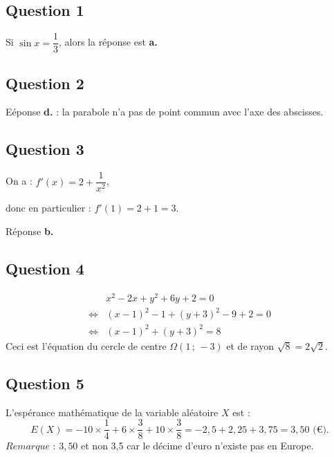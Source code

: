 \subsection*{Question 1}

Si \( \sin x = \dfrac{1}{3} \), alors la réponse est \textbf{a.}

\subsection*{Question 2}

Eéponse \textbf{d.} : la parabole n'a pas de point commun avec l'axe des abscisses.

\subsection*{Question 3}

On a : \(f'(x) = 2 + \dfrac{1}{x^2}\),

donc en particulier : \(f'(1) = 2 + 1 = 3\).

Réponse \textbf{b.}

\subsection*{Question 4}

\begin{align*}
&x^2 - 2x + y^2 + 6y + 2 = 0  \\
\iff &(x - 1)^2 - 1 + (y + 3)^2 - 9 + 2 = 0 \\
\iff &(x - 1)^2 + (y + 3)^2 = 8
\end{align*}
Ceci est l'équation du cercle de centre \( \Omega(1\,;\,-3) \) et de rayon \( \sqrt{8} = 2\sqrt{2} \).

\subsection*{Question 5}

L'espérance mathématique de la variable aléatoire \( X \) est :
\[
E(X) = -10 \times \dfrac{1}{4} + 6 \times \dfrac{3}{8} + 10 \times \dfrac{3}{8} = -2{,}5 + 2{,}25 + 3{,}75 = 3{,}50 \text{ (€)}.
\]
\(\textit{Remarque : }  3{,}50\) et non 3{,}5 car le décime d'euro n'existe pas en Europe.
